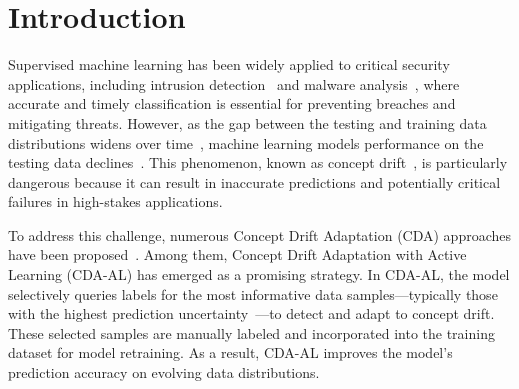 \section{Introduction}
\label{Sec: Introduction}
Supervised machine learning has been widely applied to critical security applications, including intrusion detection~\cite{yang2024recda} and malware analysis~\cite{fernando2024fesad}, where accurate and timely classification is essential for preventing breaches and mitigating threats.
However, as the gap between the testing and training data distributions widens over time~\cite{park2016active}, machine learning models performance on the testing data declines~\cite{malekghaini2023deep}.
This phenomenon, known as concept drift~\cite{2018-CCF-A-concept-drift-A-review,2024-1Q-An-overview-CDA,2024-1Q-survey-CDA}, is particularly dangerous because it can result in inaccurate predictions and potentially critical failures in high-stakes applications.

To address this challenge, numerous Concept Drift Adaptation (CDA) approaches have been proposed~\cite{2023-Q1-Concept-drift-handling,2023-Detecting-group-concept-drift-from-multiple-data-streams-1qu,aaaiYuLZ024}. 
Among them, Concept Drift Adaptation with Active Learning (CDA-AL)\cite{2023-Usenix-chenyizhen,liu2021comprehensive,krawczyk2018combining} has emerged as a promising strategy. 
In CDA-AL, the model selectively queries labels for the most informative data samples—typically those with the highest prediction uncertainty~\cite{ren2021survey,2023-Usenix-chenyizhen}—to detect and adapt to concept drift. 
These selected samples are manually labeled and incorporated into the training dataset for model retraining. 
As a result, CDA-AL improves the model's prediction accuracy on evolving data distributions.

